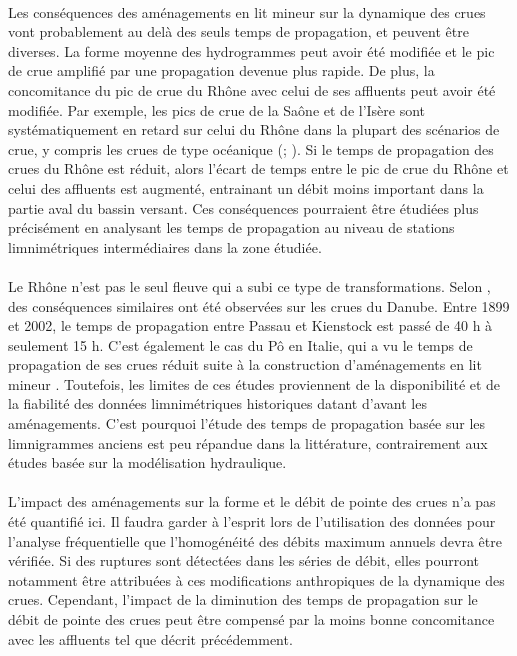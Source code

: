 	\paragraph{} Les conséquences des aménagements en lit mineur sur la dynamique des crues vont probablement au delà des seuls temps de propagation, et peuvent être diverses. La forme moyenne des hydrogrammes peut avoir été modifiée et le pic de crue amplifié par une propagation devenue plus rapide. De plus, la concomitance du pic de crue du Rhône avec celui de ses affluents peut avoir été modifiée. Par exemple, les pics de crue de la Saône et de l'Isère sont systématiquement en retard sur celui du Rhône dans la plupart des scénarios de crue, y compris les crues de type océanique (\cite{parde_regime_1925}; \cite{rigaudiere_etude_2000}). Si le temps de propagation des crues du Rhône est réduit, alors l'écart de temps entre le pic de crue du Rhône et celui des affluents est augmenté, entrainant un débit moins important dans la partie aval du bassin versant. Ces conséquences pourraient être étudiées plus précisément en analysant les temps de propagation au niveau de stations limnimétriques intermédiaires dans la zone étudiée.

	\paragraph{} Le Rhône n'est pas le seul fleuve qui a subi ce type de transformations. Selon \citet{mitkova_analysis_2005}, des conséquences similaires ont été observées sur les crues du Danube. Entre 1899 et 2002, le temps de propagation entre Passau et Kienstock est passé de 40 h à seulement 15 h. C'est également le cas du Pô en Italie, qui a vu le temps de propagation de ses crues réduit suite à la construction d'aménagements en lit mineur \citep{di_baldassare_analysis_2009}. Toutefois, les limites de ces études proviennent de la disponibilité et de la fiabilité des données limnimétriques historiques datant d'avant les aménagements. C'est pourquoi l'étude des temps de propagation basée sur les limnigrammes anciens est peu répandue dans la littérature, contrairement aux études basée sur la modélisation hydraulique.
	
	\paragraph{} L'impact des aménagements sur la forme et le débit de pointe des crues n'a pas été quantifié ici. Il faudra garder à l'esprit lors de l'utilisation des données pour l'analyse fréquentielle que l'homogénéité des débits maximum annuels devra être vérifiée. Si des ruptures sont détectées dans les séries de débit, elles pourront notamment être attribuées à ces modifications anthropiques de la dynamique des crues. Cependant, l'impact de la diminution des temps de propagation sur le débit de pointe des crues peut être compensé par la moins bonne concomitance avec les affluents tel que décrit précédemment.

